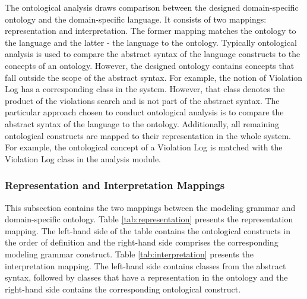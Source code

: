 \documentclass[parskip=full]{uvamscse}
\begin{document}
The ontological analysis draws comparison between the designed domain-specific ontology and the
domain-specific language. It consists of two mappings: representation and interpretation. The former
mapping matches the ontology to the language and the latter - the language to the ontology.
Typically ontological analysis is used to compare the abstract syntax of the language constructs to
the concepts of an ontology. However, the designed ontology contains concepts that fall outside the
scope of the abstract syntax. For example, the notion of Violation Log has a corresponding class in
the system. However, that class denotes the product of the violations search and is not part of the
abstract syntax. The particular approach chosen to conduct ontological analysis is to compare the
abstract syntax of the language to the ontology. Additionally, all remaining ontological constructs
are mapped to their representation in the whole system. For example, the ontological concept of a
Violation Log is matched with the Violation Log class in the analysis module.

\subsubsection{Representation and Interpretation Mappings} 

This subsection contains the two mappings between the modeling grammar and domain-specific ontology.
Table \ref{tab:representation} presents the representation mapping. The left-hand side of the table
contains the ontological constructs in the order of definition and the right-hand side comprises the
corresponding modeling grammar construct. Table \ref{tab:interpretation} presents the interpretation
mapping. The left-hand side contains classes from the abstract syntax, followed by classes that have
a representation in the ontology and the right-hand side contains the corresponding ontological
construct.
\end{document}
